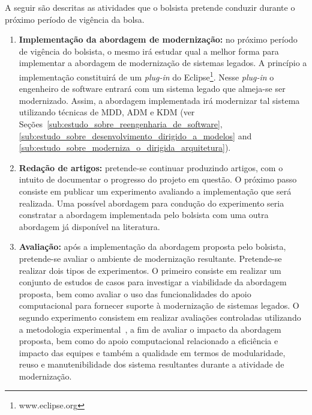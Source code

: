 A seguir são descritas as atividades que o bolsista pretende conduzir durante o próximo período de vigência da bolsa.

\begin{enumerate}
	\item \textbf{Implementação da abordagem de modernização:} no próximo período de vigência do bolsista, o mesmo irá estudar qual a melhor forma para implementar a abordagem de modernização de sistemas legados. A princípio a implementação constituirá de um \textit{plug-in} do Eclipse\footnote{www.eclipse.org}. Nesse \textit{plug-in} o engenheiro de software entrará com um sistema legado que almeja-se ser modernizado. Assim, a abordagem implementada irá modernizar tal sistema utilizando técnicas de MDD, ADM e KDM (ver Seções~\ref{sub:estudo_sobre_reengenharia_de_software}, \ref{sub:estudo_sobre_desenvolvimento_dirigido_a_modelos} and \ref{sub:estudo_sobre_moderniza_o_dirigida_arquitetura}).

	\item \textbf{Redação de artigos:} pretende-se continuar produzindo artigos, com o intuito de documentar o progresso do projeto em questão. O próximo passo consiste em publicar um experimento avaliando a implementação que será realizada. Uma possível abordagem para condução do experimento seria constratar a abordagem implementada pelo bolsista com uma outra abordagem já disponível na literatura.

	\item \textbf{Avaliação:} após a implementação da abordagem proposta pelo bolsista, pretende-se avaliar o ambiente de modernização resultante. Pretende-se realizar dois tipos de experimentos. O primeiro consiste em realizar um conjunto de estudos de casos para investigar a viabilidade da abordagem proposta, bem como avaliar o uso das funcionalidades do apoio computacional para fornecer suporte à modernização de sistemas legados. O segundo experimento consistem em realizar avaliações controladas utilizando a metodologia experimental~\cite{Wohlin}, a fim de avaliar o impacto da abordagem proposta, bem como do apoio computacional relacionado a eficiência e impacto das equipes e também a qualidade em termos de modularidade, reuso e manutenibilidade dos sistema resultantes durante a atividade de modernização. 
\end{enumerate}